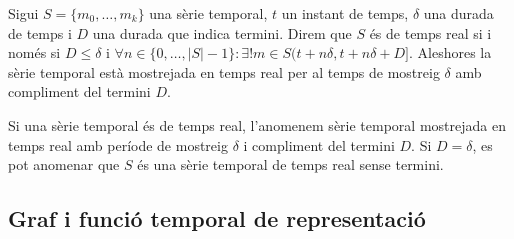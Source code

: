 \begin{definition}\label{def:st:tempsreal}
  Sigui $S=\{m_0,\dotsc,m_k\}$ una sèrie temporal, $t$ un instant de
  temps, $\delta$ una durada de temps i $D$ una durada que indica
  termini. Direm que $S$ és de temps real si i només si $D\leq\delta$
  i $\forall n\in\{0,\ldots,|S|-1\}: \exists!m \in
  S(t+n\delta,t+n\delta+D]$.  Aleshores la sèrie temporal està
  mostrejada en temps real per al temps de mostreig $\delta$ amb
  compliment del termini $D$.
\end{definition}

Si una sèrie temporal és de temps real, l'anomenem  sèrie temporal mostrejada
en temps real amb període de mostreig $\delta$ i compliment del termini $D$.
Si $D=\delta$, es pot anomenar que $S$ és una sèrie temporal de temps real sense termini.










\subsection{Graf i funció temporal de representació}
\label{sec:model:repr}

